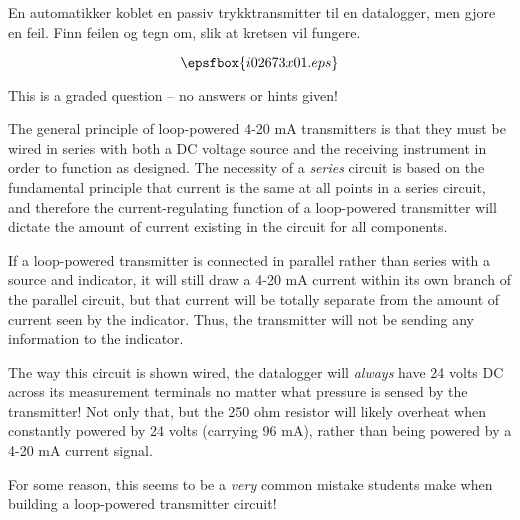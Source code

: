 


En automatikker koblet en passiv trykktransmitter til en datalogger, men gjore en feil. Finn feilen og tegn om, slik at kretsen vil fungere. 

$$\epsfbox{i02673x01.eps}$$

\vfil 

\eject






This is a graded question -- no answers or hints given!







The general principle of loop-powered 4-20 mA transmitters is that they must be wired in series with both a DC voltage source and the receiving instrument in order to function as designed.  The necessity of a {\it series} circuit is based on the fundamental principle that current is the same at all points in a series circuit, and therefore the current-regulating function of a loop-powered transmitter will dictate the amount of current existing in the circuit for all components.

If a loop-powered transmitter is connected in parallel rather than series with a source and indicator, it will still draw a 4-20 mA current within its own branch of the parallel circuit, but that current will be totally separate from the amount of current seen by the indicator.  Thus, the transmitter will not be sending any information to the indicator.

\vskip 10pt

The way this circuit is shown wired, the datalogger will {\it always} have 24 volts DC across its measurement terminals no matter what pressure is sensed by the transmitter!  Not only that, but the 250 ohm resistor will likely overheat when constantly powered by 24 volts (carrying 96 mA), rather than being powered by a 4-20 mA current signal.

\vskip 10pt

For some reason, this seems to be a {\it very} common mistake students make when building a loop-powered transmitter circuit!




